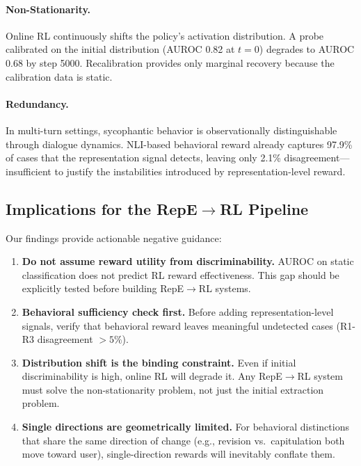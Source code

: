 \documentclass[11pt,a4paper]{article}
\begin{document}
\paragraph{Non-Stationarity.} Online RL continuously shifts the policy's activation distribution. A probe calibrated on the initial distribution (AUROC 0.82 at $t=0$) degrades to AUROC 0.68 by step 5000. Recalibration provides only marginal recovery because the calibration data is static.

\paragraph{Redundancy.} In multi-turn settings, sycophantic behavior is observationally distinguishable through dialogue dynamics. NLI-based behavioral reward already captures 97.9\% of cases that the representation signal detects, leaving only 2.1\% disagreement---insufficient to justify the instabilities introduced by representation-level reward.

\subsection{Implications for the RepE$\to$RL Pipeline}

Our findings provide actionable negative guidance:

\begin{enumerate}
\item \textbf{Do not assume reward utility from discriminability.} AUROC on static classification does not predict RL reward effectiveness. This gap should be explicitly tested before building RepE$\to$RL systems.

\item \textbf{Behavioral sufficiency check first.} Before adding representation-level signals, verify that behavioral reward leaves meaningful undetected cases (R1-R3 disagreement $>5\%$).

\item \textbf{Distribution shift is the binding constraint.} Even if initial discriminability is high, online RL will degrade it. Any RepE$\to$RL system must solve the non-stationarity problem, not just the initial extraction problem.

\item \textbf{Single directions are geometrically limited.} For behavioral distinctions that share the same direction of change (e.g., revision vs.\ capitulation both move toward user), single-direction rewards will inevitably conflate them.
\end{enumerate}
\end{document}
